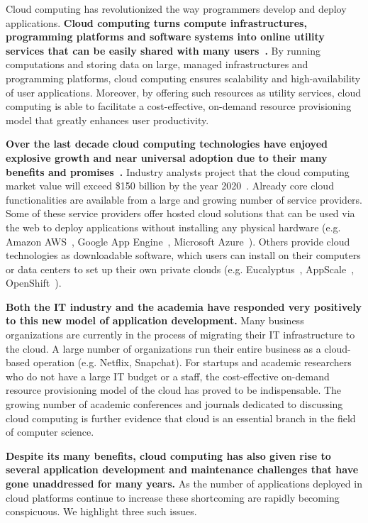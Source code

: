 Cloud computing has revolutionized the way programmers develop and deploy applications.
\textbf{Cloud computing turns compute infrastructures, programming platforms and software systems
into online utility services that can be easily shared with many users~\cite{hassan2011demystifying}.}
By running computations and storing data on large, managed infrastructures and 
programming platforms, cloud computing ensures scalability and high-availability of 
user applications. Moreover, by offering such resources
as utility services, cloud computing is able to facilitate a cost-effective, on-demand
resource provisioning model that greatly enhances user productivity.

\textbf{Over the last decade cloud computing technologies have enjoyed explosive growth 
and near universal adoption due to their many benefits and 
promises~\cite{Antonopoulos:2010:CCP:1855007,Pinheiro:2014:ACC:2618168.2618188}.} 
Industry analysts project that the cloud computing market value will exceed \$150 billion
by the year 2020~\cite{cloud-growth}.
Already core cloud 
functionalities are available from a large and growing number of service providers. 
Some of these service providers offer hosted cloud solutions that can be used
via the web to deploy applications without installing any physical hardware 
(e.g. Amazon AWS~\cite{amazon-aws-web}, Google App Engine~\cite{gae}, Microsoft Azure~\cite{azure-web}). Others
provide cloud technologies as downloadable software, which users can install
on their computers or data centers to set up their own private clouds 
(e.g. Eucalyptus~\cite{eucalyptus09}, AppScale~\cite{6488671}, OpenShift~\cite{openshift}). 

\textbf{Both the IT industry and the academia have responded very positively to this new 
model of application 
development.} Many business organizations are currently in the process of migrating
their IT infrastructure to the cloud. A large number of organizations
run their entire business as a cloud-based operation (e.g. Netflix, Snapchat). For startups
and academic researchers who do not have a large IT budget or a staff, the cost-effective 
on-demand resource provisioning model of the cloud has proved to be indispensable.
The growing number of academic conferences and journals dedicated to discussing
cloud computing is further evidence that cloud is an essential branch in the field
of computer science.

\textbf{Despite its many benefits, cloud computing has also given rise to several application
development and maintenance challenges that have gone unaddressed for many years.}
As the number of applications deployed in cloud platforms continue to increase these
shortcoming are rapidly becoming conspicuous. We highlight three such issues.
 
